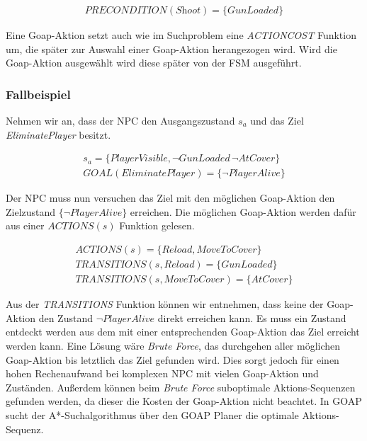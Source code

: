 \begin{align}
	\textit{PRECONDITION}(\textit{Shoot}) = \{\textit{GunLoaded}\}
\end{align}

Eine Goap-Aktion setzt auch wie im Suchproblem eine \textit{ACTIONCOST} Funktion um, die sp\"{a}ter zur Auswahl einer Goap-Aktion herangezogen wird. Wird die Goap-Aktion ausgew\"{a}hlt wird diese sp\"{a}ter von der FSM ausgef\"{u}hrt.


\subsubsection{Fallbeispiel}
\label{chap:goap action beispiel}

Nehmen wir an, dass der NPC den Ausgangszustand $s_a$ und das Ziel \textit{EliminatePlayer} besitzt.

\begin{align}
	s_a = \{\textit{PlayerVisible}, \lnot \textit{GunLoaded}\, \lnot \textit{AtCover}\} \\
	\textit{GOAL}(\textit{EliminatePlayer}) = \{\lnot \textit{PlayerAlive}\}
\end{align}


Der NPC muss nun versuchen das Ziel mit den m\"{o}glichen Goap-Aktion den Zielzustand $\{\lnot \textit{PlayerAlive}\}$ erreichen. Die m\"{o}glichen Goap-Aktion werden daf\"{u}r aus einer $\textit{ACTIONS}(s)$ Funktion gelesen.

\begin{align}
	\textit{ACTIONS}(s) = \{\textit{Reload}, \textit{MoveToCover}\} \\
	\textit{TRANSITIONS}(s,\textit{Reload}) = \{\textit{GunLoaded}\} \\
	\textit{TRANSITIONS}(s,\textit{MoveToCover}) = \{\textit{AtCover}\}
\end{align}


Aus der \textit{TRANSITIONS} Funktion k\"{o}nnen wir entnehmen, dass keine der Goap-Aktion den Zustand $\lnot \textit{PlayerAlive}$ direkt erreichen kann. Es muss ein Zustand entdeckt werden aus dem mit einer entsprechenden Goap-Aktion das Ziel erreicht werden kann. Eine L\"{o}sung w\"{a}re \textit{Brute Force}, das durchgehen aller m\"{o}glichen Goap-Aktion bis letztlich das Ziel gefunden wird. Dies sorgt jedoch f\"{u}r einen hohen Rechenaufwand bei komplexen NPC mit vielen Goap-Aktion und Zust\"{a}nden. Au\ss{}erdem k\"{o}nnen beim \textit{Brute Force} suboptimale Aktions-Sequenzen gefunden werden, da dieser die Kosten der Goap-Aktion nicht beachtet. In GOAP sucht der A*-Suchalgorithmus \"{u}ber den GOAP Planer die optimale Aktions-Sequenz.


